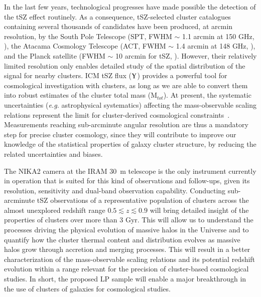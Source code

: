 \documentclass[11pt,a4paper,twoside,graphicx,color]{article}
\newcommand{\laurence}[1]{#1}
\begin{document}
In the last few years, technological progresses have made possible 
the detection of the tSZ effect routinely. As a consequence, tSZ-selected
cluster catalogues containing several thousands of candidates have been produced, at arcmin resolution, by the South Pole
Telescope (SPT, FWHM $\sim$ 1.1 arcmin at 150 GHz,
\cite{Reichardt2013, Bleem2015}), the Atacama Cosmology Telescope
(ACT, FWHM $\sim$ 1.4 arcmin at 148 GHz, \cite{Hasselfield2013}), and 
the Planck satellite (FWHM $\sim$ 10 arcmin for tSZ, \cite{PSZ1PSZ2}).   
However, their relatively limited resolution  only enables detailed study of the
spatial distribution of the signal for nearby clusters. ICM tSZ flux  ($\rm{Y}$) provides a
powerful tool for cosmological investigation with clusters, as long as
we are able to convert them into robust  estimates of the cluster total mass (M$_{tot}$).
At present, the systematic uncertainties ({\it e.g.} astrophysical systematics) affecting the mass-observable scaling relations 
represent the limit for cluster-derived cosmological constraints~\cite{PSZ1PSZ2}. 
Measurements reaching sub-arcminute angular resolution 
are thus a mandatory step for
precise cluster  cosmology, since they will contribute to
improve our knowledge of the statistical properties of galaxy cluster
structure, by reducing the related uncertainties and biases.
 

The NIKA2 camera at the IRAM
30~m telescope is the only instrument currently in operation that is
suited for this kind of observations and follow-ups, given its
resolution, sensitivity and dual-band observation capability. Conducting sub-arcminute tSZ observations of
a representative population of clusters across the almost unexplored
redshift range \laurence{$0.5 \lesssim z \lesssim 0.9$} will bring detailed insight of the
properties of clusters over more than 3 Gyr. This will allow us to
understand the processes driving the physical evolution of massive
halos in the Universe and to quantify how the cluster thermal content
and distribution evolves as massive halos   grow through
accretion and merging processes. This will
result in a better characterization of the mass-observable scaling
relations and its potential redshift evolution  within a  range relevant for   the precision of cluster-based cosmological studies. In short, the proposed LP sample will enable
a major breakthrough in the use of clusters of galaxies for
cosmological studies.
\end{document}
